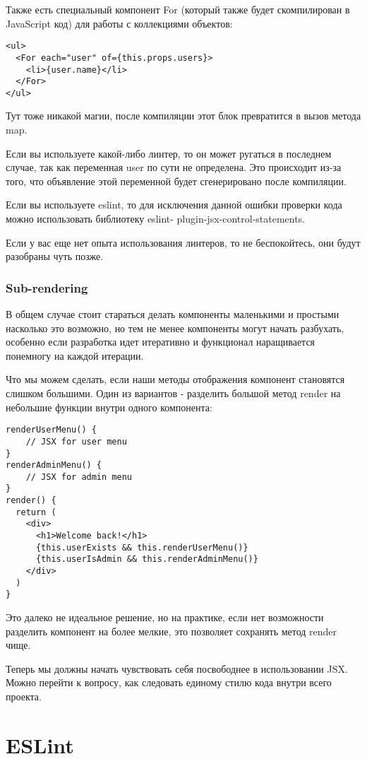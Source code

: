 \documentclass[12pt]{book}
\begin{document}
Также есть специальный компонент For (который также будет скомпилирован в JavaScript код) для работы с коллекциями объектов:

\begin{lstlisting}
<ul>
  <For each="user" of={this.props.users}>
    <li>{user.name}</li>
  </For>
</ul>
\end{lstlisting}

Тут тоже никакой магии, после компиляции этот блок превратится в вызов метода map.

Если вы используете какой-либо линтер, то он может ругаться в последнем случае, так как переменная user по сути не определена. Это происходит из-за того, что объявление этой переменной будет сгенерировано после компиляции.

Если вы используете eslint, то для исключения данной ошибки проверки кода можно использовать библиотеку eslint- plugin-jsx-control-statements.

Если у вас еще нет опыта использования линтеров, то не беспокойтесь, они будут разобраны чуть позже. 

\subsubsection*{Sub-rendering}

В общем случае стоит стараться делать компоненты маленькими и простыми насколько это возможно, но тем не менее компоненты могут начать разбухать, особенно если разработка идет итеративно и функционал наращивается понемногу на каждой итерации.

Что мы можем сделать, если наши методы отображения компонент становятся слишком большими. Один из вариантов - разделить большой метод render на небольшие функции внутри одного компонента:

\begin{lstlisting}
renderUserMenu() {
    // JSX for user menu
}
renderAdminMenu() {
    // JSX for admin menu
}
render() {
  return (
    <div>
      <h1>Welcome back!</h1>
      {this.userExists && this.renderUserMenu()}
      {this.userIsAdmin && this.renderAdminMenu()}
    </div> 
  )
}
\end{lstlisting}

Это далеко не идеальное решение, но на практике, если нет возможности разделить компонент на более мелкие, это позволяет сохранять метод render чище.

Теперь мы должны начать чувствовать себя посвободнее в использовании JSX. Можно перейти к вопросу, как следовать единому стилю кода внутри всего проекта.

\section{ESLint}
\end{document}
